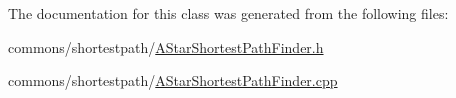 The documentation for this class was generated from the following files\+:\begin{DoxyCompactItemize}
\item 
commons/shortestpath/\mbox{\hyperlink{_a_star_shortest_path_finder_8h}{A\+Star\+Shortest\+Path\+Finder.\+h}}\item 
commons/shortestpath/\mbox{\hyperlink{_a_star_shortest_path_finder_8cpp}{A\+Star\+Shortest\+Path\+Finder.\+cpp}}\end{DoxyCompactItemize}
